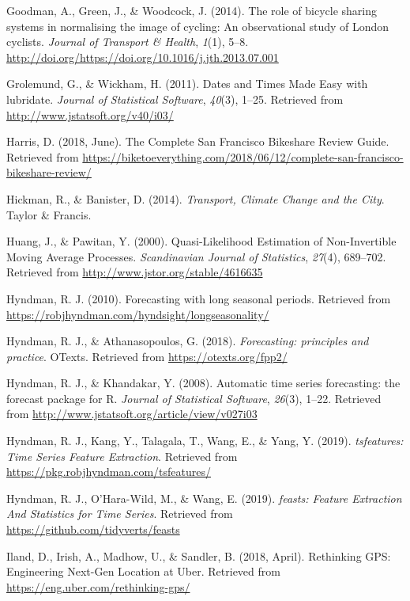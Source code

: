 \documentclass[12pt,oneside]{reedthesis}
\begin{document}
\hypertarget{ref-goodman2014}{}
Goodman, A., Green, J., \& Woodcock, J. (2014). The role of bicycle
sharing systems in normalising the image of cycling: An observational
study of London cyclists. \emph{Journal of Transport \& Health},
\emph{1}(1), 5--8.
\url{http://doi.org/https://doi.org/10.1016/j.jth.2013.07.001}

\hypertarget{ref-lubridate}{}
Grolemund, G., \& Wickham, H. (2011). Dates and Times Made Easy with
lubridate. \emph{Journal of Statistical Software}, \emph{40}(3), 1--25.
Retrieved from \url{http://www.jstatsoft.org/v40/i03/}

\hypertarget{ref-harris2018}{}
Harris, D. (2018, June). The Complete San Francisco Bikeshare Review
Guide. Retrieved from
\url{https://biketoeverything.com/2018/06/12/complete-san-francisco-bikeshare-review/}

\hypertarget{ref-hickman2014}{}
Hickman, R., \& Banister, D. (2014). \emph{Transport, Climate Change and
the City}. Taylor \& Francis.

\hypertarget{ref-huang2000}{}
Huang, J., \& Pawitan, Y. (2000). Quasi-Likelihood Estimation of
Non-Invertible Moving Average Processes. \emph{Scandinavian Journal of
Statistics}, \emph{27}(4), 689--702. Retrieved from
\url{http://www.jstor.org/stable/4616635}

\hypertarget{ref-hyndmanblog}{}
Hyndman, R. J. (2010). Forecasting with long seasonal periods. Retrieved
from \url{https://robjhyndman.com/hyndsight/longseasonality/}

\hypertarget{ref-hyndman2018fpp}{}
Hyndman, R. J., \& Athanasopoulos, G. (2018). \emph{Forecasting:
principles and practice}. OTexts. Retrieved from
\url{https://otexts.org/fpp2/}

\hypertarget{ref-forecast}{}
Hyndman, R. J., \& Khandakar, Y. (2008). Automatic time series
forecasting: the forecast package for R. \emph{Journal of Statistical
Software}, \emph{26}(3), 1--22. Retrieved from
\url{http://www.jstatsoft.org/article/view/v027i03}

\hypertarget{ref-tsfeatures}{}
Hyndman, R. J., Kang, Y., Talagala, T., Wang, E., \& Yang, Y. (2019).
\emph{tsfeatures: Time Series Feature Extraction}. Retrieved from
\url{https://pkg.robjhyndman.com/tsfeatures/}

\hypertarget{ref-feasts}{}
Hyndman, R. J., O'Hara-Wild, M., \& Wang, E. (2019). \emph{feasts:
Feature Extraction And Statistics for Time Series}. Retrieved from
\url{https://github.com/tidyverts/feasts}

\hypertarget{ref-ubereng}{}
Iland, D., Irish, A., Madhow, U., \& Sandler, B. (2018, April).
Rethinking GPS: Engineering Next-Gen Location at Uber. Retrieved from
\url{https://eng.uber.com/rethinking-gps/}
\end{document}
